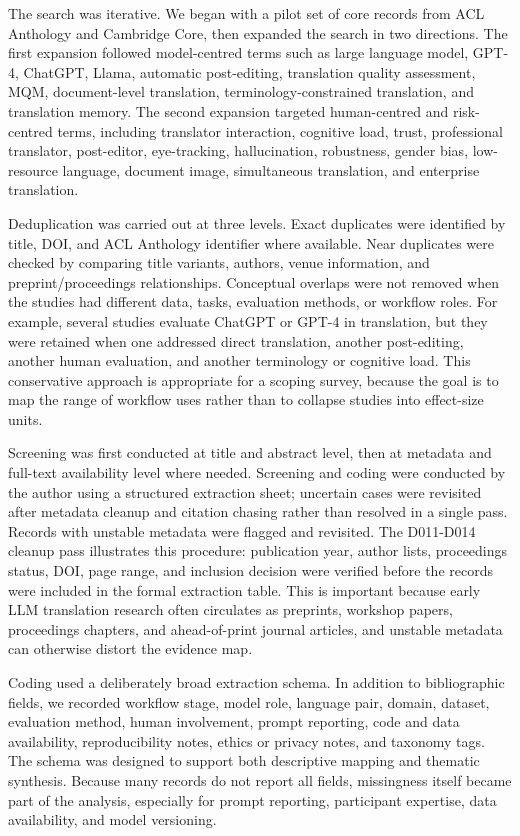 \documentclass[11pt]{article}
\begin{document}
The search was iterative. We began with a pilot set of core records from ACL Anthology and Cambridge Core, then expanded the search in two directions. The first expansion followed model-centred terms such as large language model, GPT-4, ChatGPT, Llama, automatic post-editing, translation quality assessment, MQM, document-level translation, terminology-constrained translation, and translation memory. The second expansion targeted human-centred and risk-centred terms, including translator interaction, cognitive load, trust, professional translator, post-editor, eye-tracking, hallucination, robustness, gender bias, low-resource language, document image, simultaneous translation, and enterprise translation.

Deduplication was carried out at three levels. Exact duplicates were identified by title, DOI, and ACL Anthology identifier where available. Near duplicates were checked by comparing title variants, authors, venue information, and preprint/proceedings relationships. Conceptual overlaps were not removed when the studies had different data, tasks, evaluation methods, or workflow roles. For example, several studies evaluate ChatGPT or GPT-4 in translation, but they were retained when one addressed direct translation, another post-editing, another human evaluation, and another terminology or cognitive load. This conservative approach is appropriate for a scoping survey, because the goal is to map the range of workflow uses rather than to collapse studies into effect-size units.

Screening was first conducted at title and abstract level, then at metadata and full-text availability level where needed. Screening and coding were conducted by the author using a structured extraction sheet; uncertain cases were revisited after metadata cleanup and citation chasing rather than resolved in a single pass. Records with unstable metadata were flagged and revisited. The D011-D014 cleanup pass illustrates this procedure: publication year, author lists, proceedings status, DOI, page range, and inclusion decision were verified before the records were included in the formal extraction table. This is important because early LLM translation research often circulates as preprints, workshop papers, proceedings chapters, and ahead-of-print journal articles, and unstable metadata can otherwise distort the evidence map.

Coding used a deliberately broad extraction schema. In addition to bibliographic fields, we recorded workflow stage, model role, language pair, domain, dataset, evaluation method, human involvement, prompt reporting, code and data availability, reproducibility notes, ethics or privacy notes, and taxonomy tags. The schema was designed to support both descriptive mapping and thematic synthesis. Because many records do not report all fields, missingness itself became part of the analysis, especially for prompt reporting, participant expertise, data availability, and model versioning.
\end{document}

